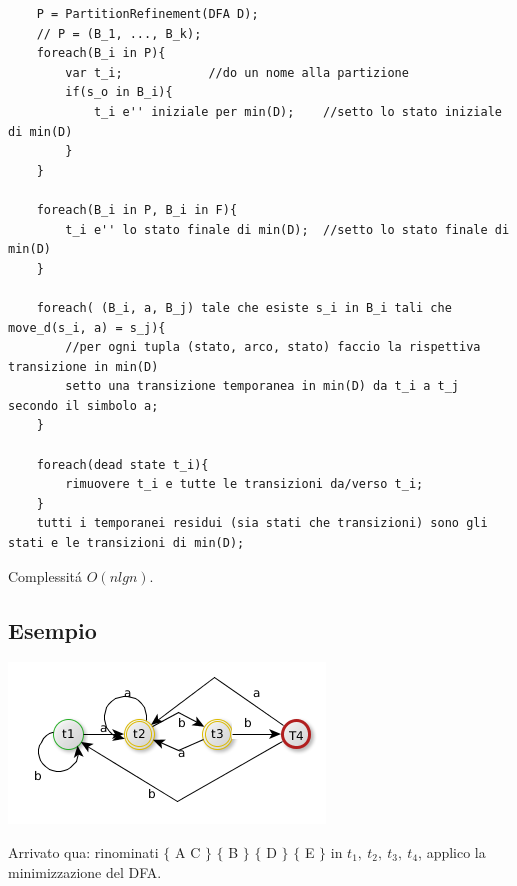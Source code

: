 \begin{lstlisting}
    P = PartitionRefinement(DFA D);
    // P = (B_1, ..., B_k);
    foreach(B_i in P){
        var t_i;            //do un nome alla partizione
        if(s_o in B_i){
            t_i e'' iniziale per min(D);    //setto lo stato iniziale di min(D)
        }
    }

    foreach(B_i in P, B_i in F){
        t_i e'' lo stato finale di min(D);  //setto lo stato finale di min(D)
    }

    foreach( (B_i, a, B_j) tale che esiste s_i in B_i tali che move_d(s_i, a) = s_j){
        //per ogni tupla (stato, arco, stato) faccio la rispettiva transizione in min(D)
        setto una transizione temporanea in min(D) da t_i a t_j secondo il simbolo a;
    }

    foreach(dead state t_i){
        rimuovere t_i e tutte le transizioni da/verso t_i;
    }
    tutti i temporanei residui (sia stati che transizioni) sono gli stati e le transizioni di min(D);
\end{lstlisting}
Complessit\'a $O(nlgn)$.

\subsection{Esempio}

\begin{center}
	\includegraphics[scale=0.5]{Chapters/Img/c02_06.png}\\
\end{center} 
Arrivato qua: rinominati $\{$ A C $\}$ $\{$ B $\}$ $\{$ D $\}$ $\{$ E $\}$ in $t_1,\ t_2,\ t_3,\ t_4 $,
applico la minimizzazione del DFA.

